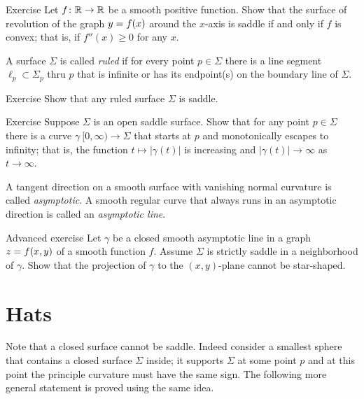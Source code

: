 \begin{thm}{Exercise}\label{ex:convex-revolution}
Let $f\colon\mathbb{R}\to\mathbb{R}$ be a smooth positive function.
Show that the surface of revolution of the graph $y\z=f(x)$ around the $x$-axis
 is saddle if and only if $f$ is convex; that is, if $f''(x)\ge0$ for any $x$.
\end{thm}

A surface $\Sigma$ is called \emph{ruled} if for every point $p\in \Sigma$ there is a line segment $\ell_p\subset \Sigma_p$ thru $p$ that is infinite or has its endpoint(s) on the boundary line of $\Sigma$.

\begin{thm}{Exercise}\label{ex:ruled=>saddle}
Show that any ruled surface $\Sigma$ is saddle.
\end{thm}

\begin{thm}{Exercise}\label{ex:saddle-to-infty}
Suppose $\Sigma$ is an open saddle surface.
Show that for any point $p\in \Sigma$ there is a curve $\gamma\:[0,\infty)\to\Sigma$ that starts at $p$ and monotonically escapes to infinity;
that is, the function $t\mapsto|\gamma(t)|$ is increasing and $|\gamma(t)|\to\infty$ as $t\to\infty$.
\end{thm}

A tangent direction on a smooth surface with vanishing normal curvature is called \emph{asymptotic}.
A smooth regular curve that always runs in an asymptotic direction is called an
\emph{asymptotic line}.\label{page:asymptotic line}

\begin{thm}{Advanced exercise}\label{ex:panov}
Let $\gamma$ be a closed smooth asymptotic line
in a graph $z\z=f(x,y)$ of a smooth function $f$. 
Assume $\Sigma$ is strictly saddle in a neighborhood of $\gamma$.
Show that the projection of $\gamma$ to the $(x,y)$-plane cannot be star-shaped. %
\end{thm}

\section*{Hats}

Note that a closed surface cannot be saddle.
Indeed consider a smallest sphere that contains a closed surface $\Sigma$ inside;
it supports $\Sigma$ at some point $p$ and at this point the principle curvature must have the same sign.
The following more general statement  is proved using the same idea.

